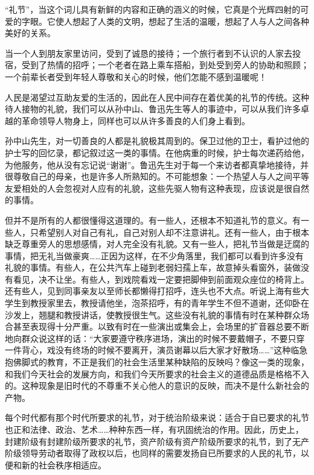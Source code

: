 \documentclass[12pt,UTF-8,openany]{ctexbook}
\begin{document}
\begin{normalsize}
    
    “礼节”，当这个词儿具有新鲜的内容和正确的涵义的时候，它真是个光辉四射的可爱的字眼。它使人想起了人类的文明，想起了生活的温暖，想起了人与人之间各种美好的关系。
    
    当一个人到朋友家里访问，受到了诚恳的接待；一个旅行者到不认识的人家去投宿，受到了热情的招呼；一个老者在路上乘车搭船，到处受到旁人的协助和照顾；一个前辈长者受到年轻人尊敬和关心的时候，他们怎能不感到温暖呢！
    
    人民是渴望过互助友爱的生活的，因此在人民中间存在着优美的礼节的传统。这种待人接物的礼貌，我们可以从孙中山、鲁迅先生等人的事迹中，可以从我们许多卓越的革命领导人物身上，同样也可以从许多善良的人们身上看到。
    
    孙中山先生，对一切善良的人都是礼貌极其周到的。保卫过他的卫士，看护过他的护士写的回忆录，都记叙过这一类的事情。在他病重的时候，护士每次递药给他，为他服务，他从没有忘记说“谢谢”。鲁迅先生对于每一个来访者都真挚地接待，并很尊敬自己的母亲，也是许多人所熟知的。不可能想象：一个热望人与人之间平等友爱相处的人会忽视对人应有的礼貌，这些先驱人物有这种表现，应该说是很自然的事情。
    
    但并不是所有的人都很懂得这道理的。有一些人，还根本不知道礼节的意义。有一些人，只希望别人对自己有礼，自己对别人却不注意讲礼。还有一些人，由于根本缺乏尊重旁人的思想感情，对人完全没有礼貌。又有一些人，把礼节当做是迂腐的事情，把无礼当做豪爽……正因为这样，在不少角落里，我们都可以看到许多没有礼貌的事情。有些人，在公共汽车上碰到老弱妇孺上车，故意掉头看窗外，装做没有看见，决不让坐。有些人，到戏院看戏一定要把脚伸到前面观众座位的椅背上。还有些人，见到同事亲友以至师长都懒得打招呼，连头也不大点。听说上海有些大学生到教授家里去，教授请他坐，泡茶招呼，有的青年学生不但不道谢，还仰卧在沙发上，翘腿和教授讲话，使教授很生气。这些没有礼貌的事情有时在某种群众场合甚至表现得十分严重。以致有时在一些演出或集会上，会场里的扩音器总要不断地向群众说这样的话：“大家要遵守秩序进场，演出的时候不要戴帽子，不要只穿一件背心，戏没有终场的时候不要离开，演员谢幕以后大家才好散场……”这种临急抱佛脚式的教育，不正是我们的社会生活里某种缺陷的反映吗？像这一类的现象，和我们今天社会的发展方向，和我们今天所要求的社会主义的道德品质是格格不入的。这种现象是旧时代的不尊重不关心他人的意识的反映，而决不是什么新社会的产物。
    
    每个时代都有那个时代所要求的礼节，对于统治阶级来说：适合于自已要求的礼节也正和法律、政治、艺术……种种东西一样，有巩固统治的作用。因此，历史上，封建阶级有封建阶级所要求的礼节，资产阶级有资产阶级所要求的礼节，到了无产阶级领导劳动者取得了政权以后，也同样的需要发扬自已所要求的人民的礼节，以便和新的社会秩序相适应。
    

\end{normalsize}
\end{document}

